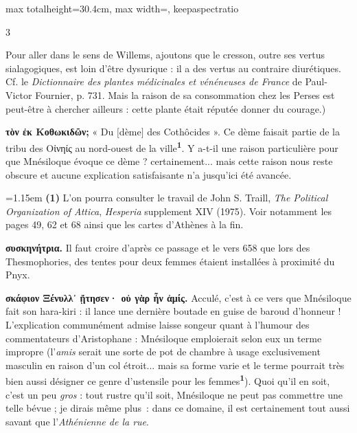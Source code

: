 \documentclass[11pt,twoside]{book}
\newcommand{\italique}[1]{\textit{#1}}
\newcommand{\grec}[1]{{\policeGr #1}}
\newcommand{\marqueur}[1]{\textsuperscript{\color{rubricRed}\textbf{#1}}}
\begin{document}
\begin{adjustbox}{max totalheight=30.4cm, max width=\textwidth, keepaspectratio}
\begin{minipage}{\textwidth}
{\begin{multicols}{3}
\par\vspace{1.5pt}
\noindent Pour aller dans le sens de Willems, ajoutons que le cresson, outre ses vertus sialagogiques, est loin d'être dysurique : il a des vertus au contraire diurétiques. Cf. le \italique{Dictionnaire des plantes médicinales et vénéneuses de France} de Paul-Victor Fournier, p. 731. Mais la raison de sa consommation chez les Perses est peut-être à chercher ailleurs : cette plante était réputée donner du courage.)
\par\vspace{1.5pt}
 \textbf{τὸν ἐκ Κοθωκιδῶν;} « Du $[$dème$]$ des Cothôcides ». Ce dème faisait partie de la tribu des \grec{Οἰνηίς} au nord-ouest de la ville\marqueur{1}. Y a-t-il une raison particulière pour que Mnésiloque évoque ce dème ? certainement... mais cette raison nous reste obscure et aucune explication satisfaisante n'a jusqu'ici été avancée.
\par\vspace{1.5pt}
\par\vspace{1.2pt}\par\nopagebreak\vspace{1pt}\noindent\hangindent=1.15em {\color{sepiaNote}\textbf{(1)}} L'on pourra consulter le travail de John S. Traill, \italique{The Political Organization of Attica}, \italique{Hesperia} supplement XIV (1975). Voir notamment les pages 49, 62 et 68 ainsi que les cartes d'Athènes à la fin.
\par\vspace{1.5pt}
 \textbf{συσκηνήτρια.} Il faut croire d'après ce passage et le vers 658 que lors des Thesmophories, des tentes pour deux femmes étaient installées à proximité du Pnyx.
\par\vspace{1.5pt}
 \textbf{σκάφιον Ξένυλλ᾽ ᾔτησεν· οὐ γὰρ ἦν ἀμίς.} Acculé, c'est à ce vers que Mnésiloque fait son hara-kiri : il lance une dernière boutade en guise de baroud d'honneur ! L'explication communément admise laisse songeur quant à l'humour des commentateurs d'Aristophane : Mnésiloque emploierait selon eux un terme impropre (l'\italique{amis} serait une sorte de pot de chambre à usage exclusivement masculin en raison d'un col étroit... mais sa forme varie et le terme pourrait très bien aussi désigner ce genre d'ustensile pour les femmes\marqueur{1}). Quoi qu'il en soit, c'est un peu \italique{gros} : tout rustre qu'il soit, Mnésiloque ne peut pas commettre une telle bévue ; je dirais même plus~: dans ce domaine, il est certainement tout aussi savant que l'\italique{Athénienne de la rue}.

\end{multicols}}
\end{minipage}
\end{adjustbox}
\end{document}
